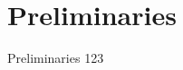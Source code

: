\chapter{Preliminaries}
\label{prelim}

Preliminaries 123

\renewcommand\thefigure{\thechapter .\arabic{figure}}

